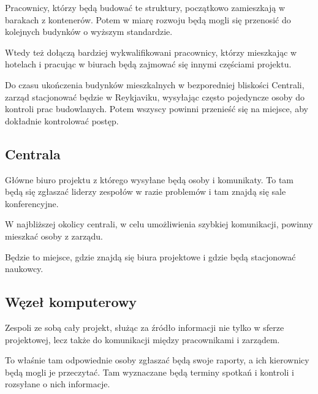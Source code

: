 Pracownicy, którzy będą budować te struktury, początkowo zamieszkają w barakach z kontenerów. Potem w miarę rozwoju będą mogli się przenosić do kolejnych budynków o wyższym standardzie.

Wtedy też dołączą bardziej wykwalifikowani pracownicy, którzy mieszkając w hotelach i pracując w biurach będą zajmować się innymi częściami projektu.

Do czasu ukończenia budynków mieszkalnych w bezporedniej bliskości Centrali, zarząd stacjonować będzie w Reykjaviku, wysyłając często pojedyncze osoby do kontroli prac budowlanych. Potem wszyscy powinni przenieść się na miejsce, aby dokładnie kontrolować postęp.

\subsection{Centrala}
Główne biuro projektu z którego wysyłane będą osoby i komunikaty.
To tam będą się zgłaszać liderzy zespołów w razie problemów i tam znajdą się sale konferencyjne.

W najbliższej okolicy centrali, w celu umożliwienia szybkiej komunikacji, powinny mieszkać osoby z zarządu.

Będzie to miejsce, gdzie znajdą się biura projektowe i gdzie będą stacjonować naukowcy.

\subsection{Węzeł komputerowy}
Zespoli ze sobą cały projekt, służąc za źródło informacji nie tylko w sferze projektowej, lecz także do komunikacji między pracownikami i zarządem.

To właśnie tam odpowiednie osoby zgłaszać będą swoje raporty, a ich kierownicy będą mogli je przeczytać.
Tam wyznaczane będą terminy spotkań i kontroli i rozsyłane o nich informacje.